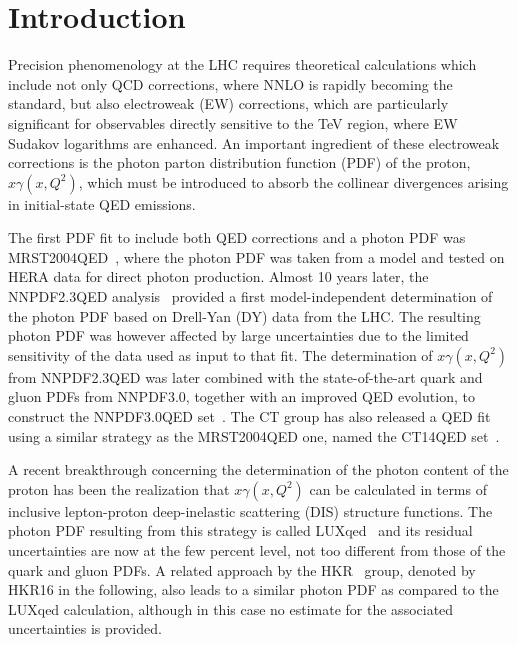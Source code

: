 \section{Introduction}

Precision phenomenology at the LHC requires theoretical calculations
which include not only QCD corrections, where NNLO is rapidly becoming
the standard, but also electroweak (EW) corrections, which are
particularly significant for observables directly sensitive to the TeV
region, where EW Sudakov logarithms are enhanced.
%
An important ingredient of these electroweak corrections is the photon
parton distribution function (PDF) of the proton, $x\gamma(x,Q^2)$, which must be introduced to absorb
the collinear divergences arising in initial-state QED emissions.

The first PDF fit to include both QED corrections and a photon PDF was
MRST2004QED~\cite{Martin:2004dh}, where the photon PDF was taken from
a model and tested on HERA data for direct photon production.
%
Almost 10 years later, the NNPDF2.3QED analysis~\cite{Ball:2012cx,Ball:2013hta} provided a
first model-independent determination of the photon PDF based on
Drell-Yan (DY) data from the LHC.
%
The resulting photon PDF was however affected by large uncertainties
due to the limited sensitivity of the data used as input to that fit.
%
The determination of $x\gamma(x,Q^2)$ from NNPDF2.3QED was later combined
with the state-of-the-art quark and gluon
PDFs from NNPDF3.0, together with an improved QED evolution,
to construct the NNPDF3.0QED set~\cite{Bertone:2016ume,Ball:2014uwa}.
%
The CT group has also  released a QED fit using a similar
strategy as the MRST2004QED one, named the CT14QED set~\cite{Schmidt:2015zda}.

A recent breakthrough concerning the determination of the photon content of
the proton
has been the realization that  $x\gamma(x,Q^2)$
can be calculated in terms of
inclusive lepton-proton deep-inelastic scattering (DIS) structure functions.
%
The photon PDF resulting from this
strategy is called  LUXqed~\cite{Manohar:2016nzj} and its residual uncertainties are now at the few
percent level, not too different from those
of the quark and gluon PDFs.
%
A related approach by the HKR~\cite{Harland-Lang:2016apc}
group, denoted by HKR16 in the following, also leads to a similar photon PDF
as compared to the LUXqed calculation, although in this case no estimate
for the associated uncertainties is provided.

